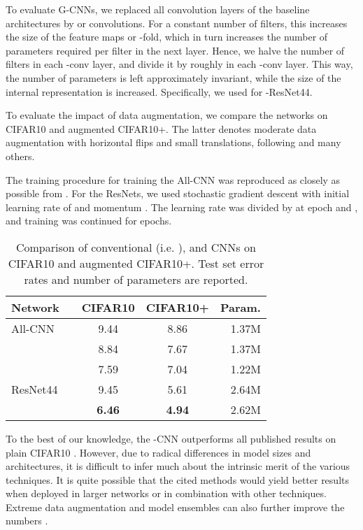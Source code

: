 \documentclass{article}
\begin{document}
To evaluate G-CNNs, we replaced all convolution layers of the baseline architectures by  or  convolutions.
For a constant number of filters, this increases the size of the feature maps  or -fold, which in turn increases the number of parameters required per filter in the next layer.
Hence, we halve the number of filters in each -conv layer, and divide it by roughly  in each -conv layer.
This way, the number of parameters is left approximately invariant, while the size of the internal representation is increased.
Specifically, we used  for -ResNet44.

To evaluate the impact of data augmentation, we compare the networks on CIFAR10 and augmented CIFAR10+.
The latter denotes moderate data augmentation with horizontal flips and small translations, following \citet{Goodfellow2013} and many others.

The training procedure for training the All-CNN was reproduced as closely as possible from \citet{Springenberg2015}.
For the ResNets, we used stochastic gradient descent with initial learning rate of  and momentum .
The learning rate was divided by  at epoch  and , and training was continued for  epochs.

\begin{table}[h!]
  \centering
  \begin{tabular}{l | c c c r}
    \hline
    Network   &     & CIFAR10 & CIFAR10+ & Param. \\
    \hline
    All-CNN   &   & 9.44 & 8.86 & 1.37M \\
              &     & 8.84 & 7.67 & 1.37M \\
              &    & 7.59 & 7.04 & 1.22M \\
    ResNet44  &   & 9.45 & 5.61 & 2.64M \\
              &    & \bf{6.46} & \bf{4.94} & 2.62M \\
    \hline
  \end{tabular}
  \caption{Comparison of conventional (i.e. ),  and  CNNs on CIFAR10 and augmented CIFAR10+. Test set error rates and number of parameters are reported.}
  \label{tbl:cifar10_results}
\end{table}


To the best of our knowledge, the -CNN outperforms all published results on plain CIFAR10 \cite{Wan2013, Goodfellow2013, Lin2013, Lee2015, Srivastava2015a, Clevert2015, Lee2015a}.
However, due to radical differences in model sizes and architectures, it is difficult to infer much about the intrinsic merit of the various techniques.
It is quite possible that the cited methods would yield better results when deployed in larger networks or in combination with other techniques.
Extreme data augmentation and model ensembles can also further improve the numbers \cite{Graham}.
\end{document}
